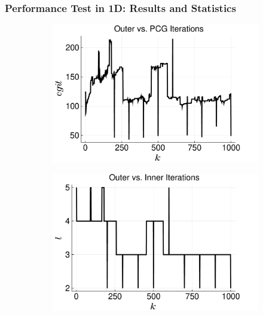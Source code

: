 \documentclass[aspectratio=169,xcolor=dvipsnames,11pt]{beamer}
\begin{document}
\begin{footnotesize}
\begin{frame}\frametitle{Performance Test in 1D: Results and Statistics}
\begin{figure}
     \centering
     \begin{subfigure}[b]{0.25\linewidth}
         \centering
         \includegraphics[width=\linewidth]{figures/cg_vec_my_1000.pdf}
         \caption{}
         \label{fig:cq-vs-outer}
     \end{subfigure}\hfill
     \begin{subfigure}[b]{0.25\linewidth}
         \centering
         \includegraphics[width=\linewidth]{figures/nwt_vec_my_1000.pdf}
         \caption{}
         \label{fig:nwt-vs-outer}
     \end{subfigure}\hfill
     \begin{subfigure}[b]{0.25\linewidth}

\end{subfigure}
\end{figure}
\end{frame}
\end{footnotesize}
\end{document}
